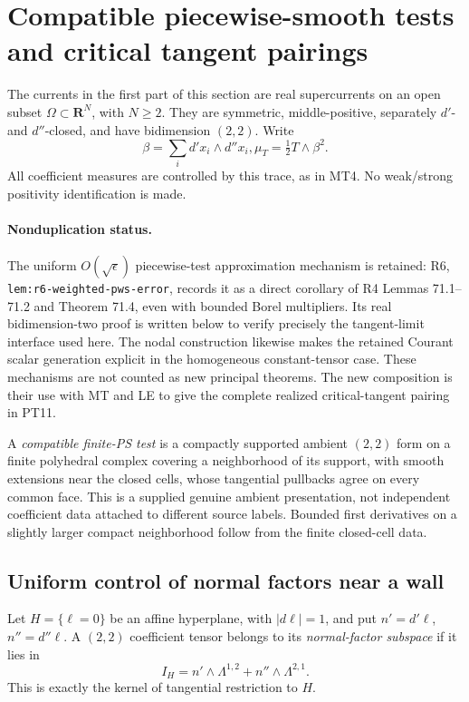 \section{Compatible piecewise-smooth tests and critical tangent pairings}
\label{sec:r13-compatible-ps-tangent-pairing}

The currents in the first part of this section are real
supercurrents on an open subset $\Omega\subset\mathbf R^N$,
with $N\ge2$.  They are symmetric, middle-positive,
separately $d'$- and $d''$-closed, and have bidimension
$(2,2)$.  Write
\[
             \beta=\sum_i d'x_i\wedge d''x_i,
                      \mu_T=\tfrac12T\wedge\beta^2.
 \tag{PT1}
\]
All coefficient measures are controlled by this trace, as in
MT4.  No weak/strong positivity identification is made.

\paragraph{Nonduplication status.}
The uniform $O(\sqrt\epsilon)$ piecewise-test approximation
mechanism is retained: R6,
\texttt{lem:r6-weighted-pws-error}, records it as a direct
corollary of R4 Lemmas 71.1--71.2 and Theorem 71.4, even
with bounded Borel multipliers.  Its real bidimension-two
proof is written below to verify precisely the tangent-limit
interface used here.  The nodal construction likewise makes
the retained Courant scalar generation explicit in the
homogeneous constant-tensor case.  These mechanisms are not
counted as new principal theorems.  The new composition is
their use with MT and LE to give the complete realized
critical-tangent pairing in PT11.

A \emph{compatible finite-PS test} is a compactly supported
ambient $(2,2)$ form on a finite polyhedral complex covering
a neighborhood of its support, with smooth extensions near
the closed cells, whose tangential pullbacks agree on every
common face.  This is a supplied genuine ambient presentation,
not independent coefficient data attached to different source
labels.  Bounded first derivatives on a slightly larger
compact neighborhood follow from the finite closed-cell data.

\subsection{Uniform control of normal factors near a wall}

Let $H=\{\ell=0\}$ be an affine hyperplane, with
$|d\ell|=1$, and put
$n'=d'\ell$, $n''=d''\ell$.  A $(2,2)$ coefficient
tensor belongs to its \emph{normal-factor subspace} if it
lies in
\[
 I_H=n'\wedge\Lambda^{1,2}
                     +n''\wedge\Lambda^{2,1}.
 \tag{PT2}
\]
This is exactly the kernel of tangential restriction to $H$.

